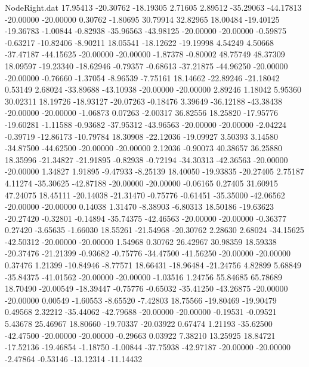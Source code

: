 \begin{filecontents}{NodeRight.dat}
  17.95413  -20.30762  -18.19305     2.71605    2.89512  -35.29063  -44.17813  -20.00000  -20.00000    0.30762   -1.80695   30.79914   32.82965
  18.00484  -19.40125  -19.36783    -1.00844   -0.82938  -35.96563  -43.98125  -20.00000  -20.00000   -0.59875   -0.63217  -10.82406   -8.90211
  18.05541  -18.12622  -19.19998     4.54249    4.50668  -37.47187  -44.15625  -20.00000  -20.00000   -1.87378   -0.80002   48.75749   48.37309
  18.09597  -19.23340  -18.62946    -0.79357   -0.68613  -37.21875  -44.96250  -20.00000  -20.00000   -0.76660   -1.37054   -8.96539   -7.75161
  18.14662  -22.89246  -21.18042     0.53149    2.68024  -33.89688  -43.10938  -20.00000  -20.00000    2.89246    1.18042    5.95360   30.02311
  18.19726  -18.93127  -20.07263    -0.18476    3.39649  -36.12188  -43.38438  -20.00000  -20.00000   -1.06873    0.07263   -2.00317   36.82556
  18.25820  -17.95776  -19.60281    -1.11588   -0.93682  -37.95312  -43.96563  -20.00000  -20.00000   -2.04224   -0.39719  -12.86173  -10.79784
  18.30908  -22.12036  -19.09927     3.50393    3.14580  -34.87500  -44.62500  -20.00000  -20.00000    2.12036   -0.90073   40.38657   36.25880
  18.35996  -21.34827  -21.91895    -0.82938   -0.72194  -34.30313  -42.36563  -20.00000  -20.00000    1.34827    1.91895   -9.47933   -8.25139
  18.40050  -19.93835  -20.27405     2.75187    4.11274  -35.30625  -42.87188  -20.00000  -20.00000   -0.06165    0.27405   31.60915   47.24075
  18.45111  -20.14038  -21.31470    -0.75776   -0.61451  -35.35000  -42.06562  -20.00000  -20.00000    0.14038    1.31470   -8.38903   -6.80313
  18.50186  -19.63623  -20.27420    -0.32801   -0.14894  -35.74375  -42.46563  -20.00000  -20.00000   -0.36377    0.27420   -3.65635   -1.66030
  18.55261  -21.54968  -20.30762     2.28630    2.68024  -34.15625  -42.50312  -20.00000  -20.00000    1.54968    0.30762   26.42967   30.98359
  18.59338  -20.37476  -21.21399    -0.93682   -0.75776  -34.47500  -41.56250  -20.00000  -20.00000    0.37476    1.21399  -10.84946   -8.77571
  18.66431  -18.96484  -21.24756     4.82899    5.68849  -35.84375  -41.01562  -20.00000  -20.00000   -1.03516    1.24756   55.84685   65.78689
  18.70490  -20.00549  -18.39447    -0.75776   -0.65032  -35.41250  -43.26875  -20.00000  -20.00000    0.00549   -1.60553   -8.65520   -7.42803
  18.75566  -19.80469  -19.90479     0.49568    2.32212  -35.44062  -42.79688  -20.00000  -20.00000   -0.19531   -0.09521    5.43678   25.46967
  18.80660  -19.70337  -20.03922     0.67474    1.21193  -35.62500  -42.47500  -20.00000  -20.00000   -0.29663    0.03922    7.38210   13.25925
  18.84721  -17.52136  -19.46854    -1.18750   -1.00844  -37.75938  -42.97187  -20.00000  -20.00000   -2.47864   -0.53146  -13.12314  -11.14432

\end{filecontents}
